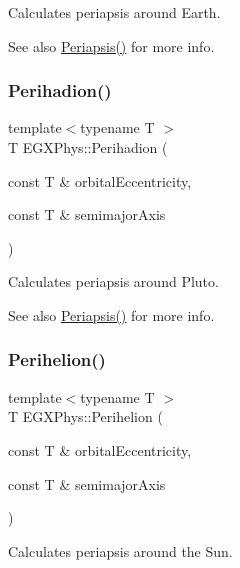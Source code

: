 Calculates periapsis around Earth. 

\begin{DoxySeeAlso}{See also}
\mbox{\hyperlink{group___periapsis_ga4414ac75539371ec874a3d25cad6c9fe}{Periapsis()}} for more info. 
\end{DoxySeeAlso}
\mbox{\label{group___periapsis_gafb16e46e55078b38604eef0d7c7c40c4}} 
\subsubsection{\texorpdfstring{Perihadion()}{Perihadion()}}
{\footnotesize\ttfamily template$<$typename T $>$ \\
T E\+G\+X\+Phys\+::\+Perihadion (\begin{DoxyParamCaption}\item[{const T \&}]{orbital\+Eccentricity,  }\item[{const T \&}]{semimajor\+Axis }\end{DoxyParamCaption})}



Calculates periapsis around Pluto. 

\begin{DoxySeeAlso}{See also}
\mbox{\hyperlink{group___periapsis_ga4414ac75539371ec874a3d25cad6c9fe}{Periapsis()}} for more info. 
\end{DoxySeeAlso}
\mbox{\label{group___periapsis_ga941d285e3a0b48ada9c9f60925ff63c2}} 
\subsubsection{\texorpdfstring{Perihelion()}{Perihelion()}}
{\footnotesize\ttfamily template$<$typename T $>$ \\
T E\+G\+X\+Phys\+::\+Perihelion (\begin{DoxyParamCaption}\item[{const T \&}]{orbital\+Eccentricity,  }\item[{const T \&}]{semimajor\+Axis }\end{DoxyParamCaption})}



Calculates periapsis around the Sun. 

